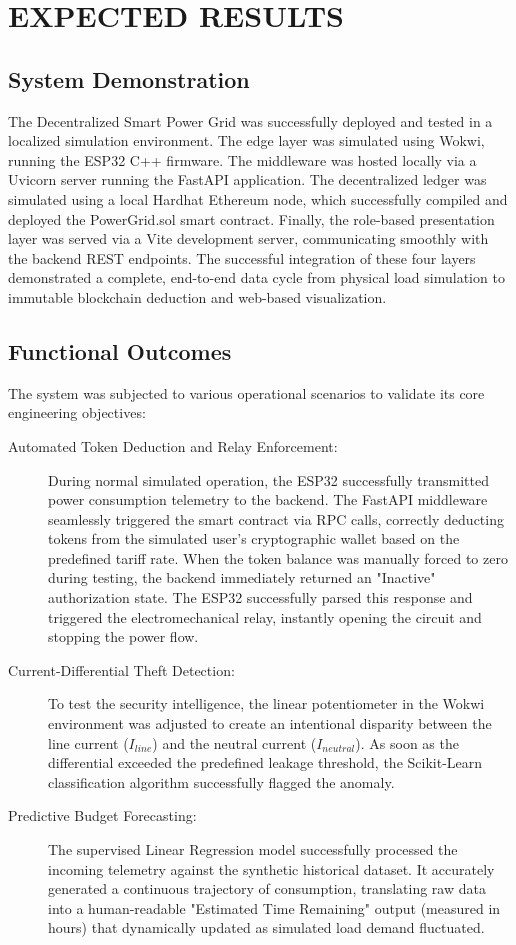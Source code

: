 \chapter{EXPECTED RESULTS}

\section{System Demonstration}
The Decentralized Smart Power Grid was successfully deployed and tested in a localized simulation environment. The edge layer was simulated using Wokwi, running the ESP32 C++ firmware. The middleware was hosted locally via a Uvicorn server running the FastAPI application. The decentralized ledger was simulated using a local Hardhat Ethereum node, which successfully compiled and deployed the PowerGrid.sol smart contract. Finally, the role-based presentation layer was served via a Vite development server, communicating smoothly with the backend REST endpoints. The successful integration of these four layers demonstrated a complete, end-to-end data cycle from physical load simulation to immutable blockchain deduction and web-based visualization.

\section{Functional Outcomes}
The system was subjected to various operational scenarios to validate its core engineering objectives:
\begin{description}
    \item[Automated Token Deduction and Relay Enforcement:]
    During normal simulated operation, the ESP32 successfully transmitted power consumption telemetry to the backend. The FastAPI middleware seamlessly triggered the smart contract via RPC calls, correctly deducting tokens from the simulated user's cryptographic wallet based on the predefined tariff rate. When the token balance was manually forced to zero during testing, the backend immediately returned an "Inactive" authorization state. The ESP32 successfully parsed this response and triggered the electromechanical relay, instantly opening the circuit and stopping the power flow.
    \item[Current-Differential Theft Detection:]
    To test the security intelligence, the linear potentiometer in the Wokwi environment was adjusted to create an intentional disparity between the line current ($I_{line}$) and the neutral current ($I_{neutral}$). As soon as the differential exceeded the predefined leakage threshold, the Scikit-Learn classification algorithm successfully flagged the anomaly.
    \item[Predictive Budget Forecasting:] 
    The supervised Linear Regression model successfully processed the incoming telemetry against the synthetic historical dataset. It accurately generated a continuous trajectory of consumption, translating raw data into a human-readable "Estimated Time Remaining" output (measured in hours) that dynamically updated as simulated load demand fluctuated.
\end{description}

